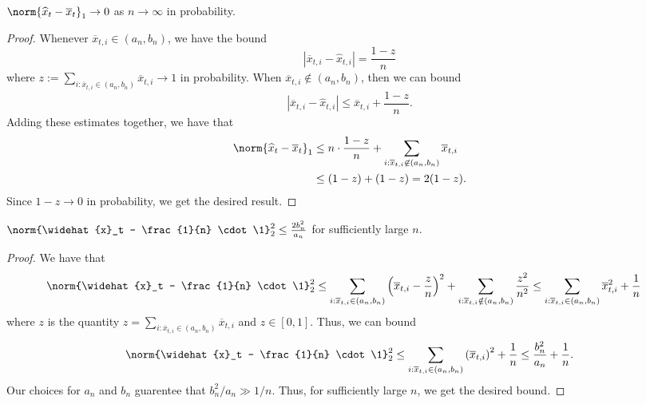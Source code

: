 \documentclass[12pt]{article}
\begin{document}
\begin{lem} \label{tool-woohoo}
	$\norm{\widehat{x}_t - \overline{x}_t}_1 \to 0$ as $n \to \infty$ in probability. 
\end{lem}
\begin{proof}
	Whenever $\overline{x}_{t, i} \in (a_n, b_n)$, we have the bound
	\[
		|\overline{x}_{t, i} - \widehat{x}_{t, i}| = \frac{1 - z}{n}
	\]
	where $z := \sum_{i : \overline{x}_{t, i} \in (a_n, b_n)} \overline{x}_{t, i} \to 1$ in probability. When $\overline{x}_{t, i} \not\in (a_n, b_n)$, then we can bound
	\[
		| \overline{x}_{t,i} - \widehat{x}_{t, i}| \leq \overline{x}_{t, i} + \frac{1-z}{n}.
	\]
	Adding these estimates together, we have that
	\begin{align*}
		\norm{\widehat{x}_t - \overline{x}_t}_1 & \leq n \cdot \frac{1-z}{n} + \sum_{i : \overline{x}_{t, i} \not\in (a_n, b_n)} \overline{x}_{t, i} \\
		& \leq (1-z) + (1 - z) = 2(1-z).
	\end{align*}
	Since $1-z \to 0$ in probability, we get the desired result.
\end{proof}
\begin{lem}
	$\norm{\widehat{x}_t - \frac{1}{n} \cdot \1}_2^2 \leq \frac{2b_n^2}{a_n}$ for sufficiently large $n$.
\end{lem}

\begin{proof}
	We have that 
	\begin{align*}
		\norm{\widehat{x}_t - \frac{1}{n} \cdot \1}_2^2 & \leq \sum_{i : \overline{x}_{t, i} \in (a_n, b_n)} \left ( \overline{x}_{t, i} - \frac{z}{n} \right )^2 + \sum_{i : \overline{x}_{t, i} \notin (a_n, b_n)} \frac{z^2}{n^2} \leq \sum_{i : \overline{x}_{t, i} \in (a_n, b_n)} \overline{x}_{t, i}^2 + \frac{1}{n}
	\end{align*}
	where $z$ is the quantity $z = \sum_{i : \overline{x}_{t, i} \in (a_n, b_n)} \overline{x}_{t, i}$ and $z \in [0, 1]$. 
	Thus, we can bound 
	\[
		\norm{\widehat{x}_t - \frac{1}{n} \cdot \1}_2^2	\leq \sum_{i : \overline{x}_{t, i} \in (a_n, b_n)} \left ( \overline{x}_{t, i} \right )^2 + \frac{1}{n} \leq \frac{b_n^2}{a_n} + \frac{1}{n}.
	\]
	Our choices for $a_n$ and $b_n$ guarentee that $b_n^2 / a_n \gg 1/n$. Thus, for sufficiently large $n$, we get the desired bound.
\end{proof}
\end{document}
